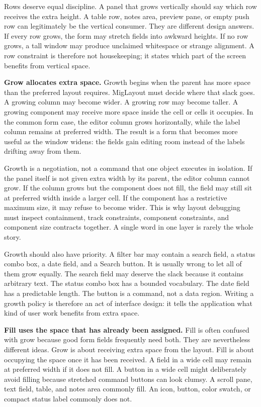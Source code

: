 Rows deserve equal discipline. A panel that grows vertically should say which
row receives the extra height. A table row, notes area, preview pane, or empty
push row can legitimately be the vertical consumer. They are different design
answers. If every row grows, the form may stretch fields into awkward heights.
If no row grows, a tall window may produce unclaimed whitespace or strange
alignment. A row constraint is therefore not housekeeping; it states which
part of the screen benefits from vertical space.

\textbf{Grow allocates extra space.} Growth begins when the parent has more
space than the preferred layout requires. MigLayout must decide where that
slack goes. A growing column may become wider. A growing row may become taller.
A growing component may receive more space inside the cell or cells it
occupies. In the common form case, the editor column grows horizontally, while
the label column remains at preferred width. The result is a form that becomes
more useful as the window widens: the fields gain editing room instead of the
labels drifting away from them.

Growth is a negotiation, not a command that one object executes in isolation.
If the panel itself is not given extra width by its parent, the editor column
cannot grow. If the column grows but the component does not fill, the field may
still sit at preferred width inside a larger cell. If the component has a
restrictive maximum size, it may refuse to become wider. This is why layout
debugging must inspect containment, track constraints, component constraints,
and component size contracts together. A single word in one layer is rarely the
whole story.

Growth should also have priority. A filter bar may contain a search field, a
status combo box, a date field, and a Search button. It is usually wrong to let
all of them grow equally. The search field may deserve the slack because it
contains arbitrary text. The status combo box has a bounded vocabulary. The
date field has a predictable length. The button is a command, not a data
region. Writing a growth policy is therefore an act of interface design: it
tells the application what kind of user work benefits from extra space.

\textbf{Fill uses the space that has already been assigned.} Fill is often
confused with grow because good form fields frequently need both. They are
nevertheless different ideas. Grow is about receiving extra space from the
layout. Fill is about occupying the space once it has been received. A field in
a wide cell may remain at preferred width if it does not fill. A button in a
wide cell might deliberately avoid filling because stretched command buttons
can look clumsy. A scroll pane, text field, table, and notes area commonly
fill. An icon, button, color swatch, or compact status label commonly does not.

